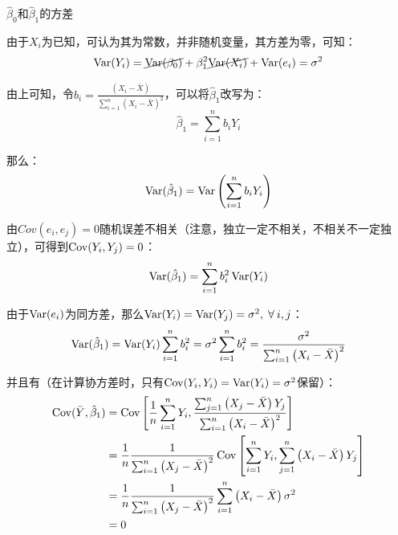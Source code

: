 \documentclass[11pt]{article}
\begin{document}
\begin{property}
    $\hat{\beta}_0$和$\hat{\beta}_1$的方差

    由于$X_i$为已知，可认为其为常数，并非随机变量，其方差为零，可知：
    \begin{equation*}
        \operatorname{Var}(Y_i) = \cancel{\operatorname{Var}(\beta_0)} + \beta_1^2 \cancel{\operatorname{Var}(X_i)} + \operatorname{Var}(e_i) = \sigma^2
    \end{equation*}

    由上可知，令$b_i = \frac{\left(X_i - \bar{X}\right)}{\sum_{i=1}^{n} \left(X_i - \bar{X}\right)^2}$，可以将$\hat{\beta}_1$改写为：
    \begin{equation*}
        \hat{\beta}_1 = \sum_{i=1}^{n} b_i Y_i
    \end{equation*}

    那么：
    \begin{equation*}
        \operatorname{Var}(\hat{\beta}_1) = \operatorname{Var}\left( \sum_{i=1}^{n} b_i Y_i \right)
    \end{equation*}

    由$Cov(e_i,e_j)=0$随机误差不相关（注意，独立一定不相关，不相关不一定独立），可得到$\operatorname{Cov}(Y_i,Y_j)=0$：
    \begin{equation*}
        \operatorname{Var}(\hat{\beta}_1) = \sum_{i=1}^{n} b_i^2 \operatorname{Var}(Y_i)
    \end{equation*}

    由于$\operatorname{Var}(e_i)$为同方差，那么$\Var(Y_i) = \Var(Y_j) = \sigma^2,\; \forall i,j$：
    \begin{equation*}
        \operatorname{Var}(\hat{\beta}_1)
        = \operatorname{Var}(Y_i) \sum_{i=1}^{n} b_i^2
        = \sigma^2 \sum_{i=1}^{n} b_i^2
        = \frac{\sigma^2}{\sum_{i=1}^{n} \left(X_i - \bar{X}\right)^2}
    \end{equation*}
    
    并且有（在计算协方差时，只有$\operatorname{Cov}(Y_i,Y_i)=\operatorname{Var}(Y_i)=\sigma^2$保留）：
    \begin{align*}
        \operatorname{Cov}(\bar{Y},\hat{\beta}_1)
        &= \operatorname{Cov} \left[ \frac{1}{n} \sum_{i=1}^{n} Y_i, \frac{\sum_{j=1}^{n} \left(X_j - \bar{X}\right) Y_j}{\sum_{i=1}^{n} \left(X_i - \bar{X}\right)^2} \right] \\
        &= \frac{1}{n} \frac{1}{\sum_{i=1}^{n} \left(X_j - \bar{X}\right)^2} \operatorname{Cov} \left[ \sum_{i=1}^{n} Y_i, \sum_{j=1}^{n} \left(X_i - \bar{X}\right) Y_j \right] \\
        &= \frac{1}{n} \frac{1}{\sum_{i=1}^{n} \left(X_j - \bar{X}\right)^2} \sum_{i=1}^{n} \left(X_i - \bar{X}\right) \sigma^2 \\
        &= 0
    \end{align*}


\end{property}
\end{document}
